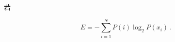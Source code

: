 
\begin{issues}
\issueDraft
\end{issues}

若

\begin{equation}
E = -\sum_{i=1}^N P(i) \log_2 P(x_i)~.
\end{equation}

